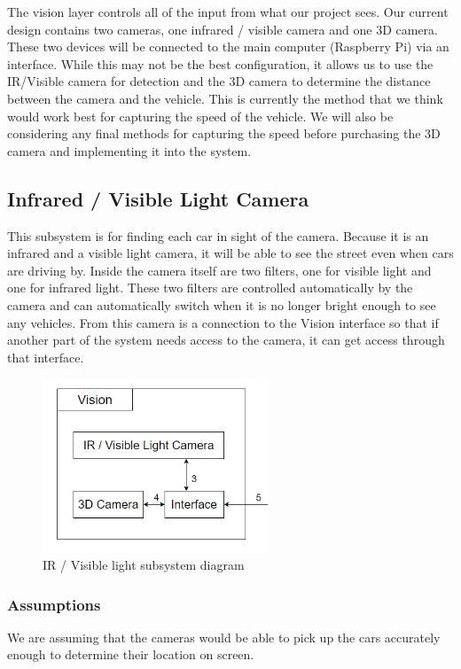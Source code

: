 The vision layer controls all of the input from what our project sees. Our current design contains two cameras, one infrared / visible camera and one 3D camera. These two devices will be connected to the main computer (Raspberry Pi) via an interface. While this may not be the best configuration, it allows us to use the IR/Visible camera for detection and the 3D camera to determine the distance between the camera and the vehicle. This is currently the method that we think would work best for capturing the speed of the vehicle. We will also be considering any final methods for capturing the speed before purchasing the 3D camera and implementing it into the system. 

\subsection{Infrared / Visible Light Camera}
This subsystem is for finding each car in sight of the camera. Because it is an infrared and a visible light camera, it will be able to see the street even when cars are driving by. Inside the camera itself are two filters, one for visible light and one for infrared light. These two filters are controlled automatically by the camera and can automatically switch when it is no longer bright enough to see any vehicles. From this camera is a connection to the Vision interface so that if another part of the system needs access to the camera, it can get access through that interface.

\begin{figure}[h!]
	\centering
 	\includegraphics[width=0.60\textwidth]{images/vision_subsystem.png}
 \caption{IR / Visible light subsystem diagram}
\end{figure}

\subsubsection{Assumptions}
We are assuming that the cameras would be able to pick up the cars accurately enough to determine their location on screen. 

